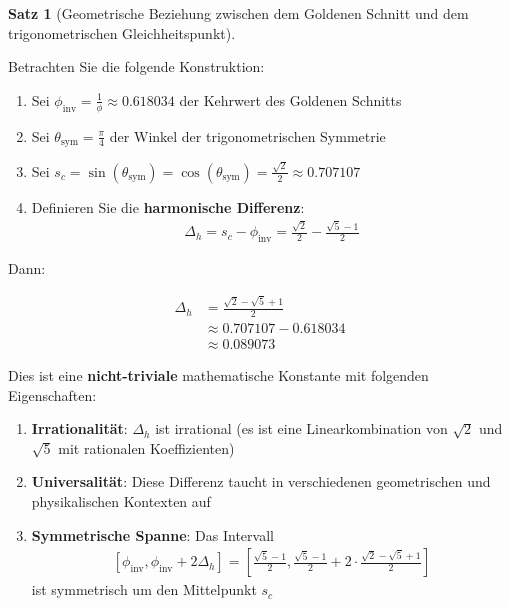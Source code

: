 \documentclass[a4paper,12pt,twoside]{report}
\theoremstyle{definition}
\newtheorem{satz}{Satz}
\begin{document}
\begin{satz}[Geometrische Beziehung zwischen dem Goldenen Schnitt und dem trigonometrischen Gleichheitspunkt]
\label{satz:harmonic_triad}

Betrachten Sie die folgende Konstruktion:

\begin{enumerate}
	\item Sei $\phi_{\text{inv}} = \frac{1}{\phi} \approx 0.618034$ der Kehrwert des Goldenen Schnitts
	
	\item Sei $\theta_{\text{sym}} = \frac{\pi}{4}$ der Winkel der trigonometrischen Symmetrie
	
	\item Sei $s_c = \sin(\theta_{\text{sym}}) = \cos(\theta_{\text{sym}}) = \frac{\sqrt{2}}{2} \approx 0.707107$
	
	\item Definieren Sie die \textbf{harmonische Differenz}:
	\begin{align}
	\Delta_h = s_c - \phi_{\text{inv}} = \frac{\sqrt{2}}{2} - \frac{\sqrt{5}-1}{2}
	\end{align}
\end{enumerate}

Dann:

\begin{align}
\Delta_h &= \frac{\sqrt{2} - \sqrt{5} + 1}{2} \\
&\approx 0.707107 - 0.618034 \\
&\approx 0.089073
\end{align}

Dies ist eine \textbf{nicht-triviale} mathematische Konstante mit folgenden Eigenschaften:

\begin{enumerate}
	\item \textbf{Irrationalität}: $\Delta_h$ ist irrational (es ist eine Linearkombination von $\sqrt{2}$ und $\sqrt{5}$ mit rationalen Koeffizienten)
	
	\item \textbf{Universalität}: Diese Differenz taucht in verschiedenen geometrischen und physikalischen Kontexten auf
	
	\item \textbf{Symmetrische Spanne}: Das Intervall 
	\begin{align}
	\left[\phi_{\text{inv}}, \phi_{\text{inv}} + 2\Delta_h\right] = \left[\frac{\sqrt{5}-1}{2}, \frac{\sqrt{5}-1}{2} + 2 \cdot \frac{\sqrt{2} - \sqrt{5} + 1}{2}\right]
	\end{align}
	ist symmetrisch um den Mittelpunkt $s_c$
\end{enumerate}
\end{satz}
\end{document}
